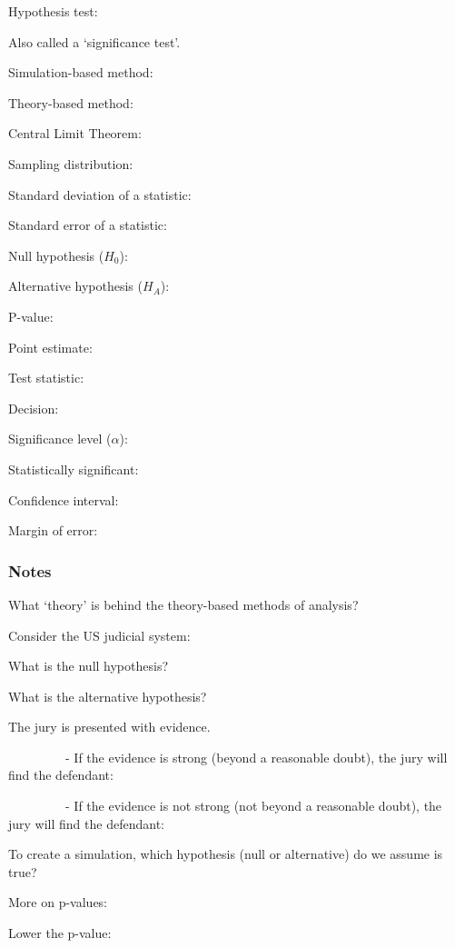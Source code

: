 \documentclass[
]{report}
\newcommand{\rgs}{\vspace{12pt}} %
\newcommand{\rgi}{\hspace{24pt}}  %
\begin{document}
Hypothesis test:

\rgi Also called a `significance test'.
\rgs

Simulation-based method:
\rgs

Theory-based method:
\rgs

Central Limit Theorem:
\rgs

Sampling distribution:
\rgs

Standard deviation of a statistic:
\rgs

Standard error of a statistic:
\rgs

Null hypothesis (\(H_0\)):
\rgs

Alternative hypothesis (\(H_A\)):
\rgs

P-value:
\rgs

Point estimate:
\rgs

Test statistic:
\rgs

Decision:
\rgs

Significance level (\(\alpha\)):
\rgs 

Statistically significant:
\rgs

Confidence interval:
\rgs

Margin of error:
\rgs

\hypertarget{notes-14}{%
\subsubsection*{Notes}\label{notes-14}}

What `theory' is behind the theory-based methods of analysis?
\rgs

Consider the US judicial system:

\rgi What is the null hypothesis?
\rgs

\rgi What is the alternative hypothesis?
\rgs

\rgi The jury is presented with evidence.

~~~~~~~~~- If the evidence is strong (beyond a reasonable doubt), the jury will find the defendant:

\rgs

~~~~~~~~~- If the evidence is not strong (not beyond a reasonable doubt), the jury will find the defendant:

\rgs

To create a simulation, which hypothesis (null or alternative) do we assume is true?
\rgs

More on p-values:

\rgi Lower the p-value:
\rgs
\end{document}
